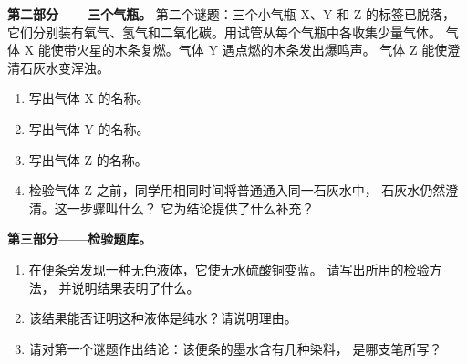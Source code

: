 \begin{problem}
\medskip
\noindent\textbf{第二部分——三个气瓶。}
第二个谜题：三个小气瓶 X、Y 和 Z 的标签已脱落，
它们分别装有氧气、氢气和二氧化碳。用试管从每个气瓶中各收集少量气体。
气体 X 能使带火星的木条复燃。气体 Y 遇点燃的木条发出爆鸣声。
气体 Z 能使澄清石灰水变浑浊。
\begin{enumerate}[resume]
  \item 写出气体 X 的名称。
  \item 写出气体 Y 的名称。
  \item 写出气体 Z 的名称。
  \item 检验气体 Z 之前，同学用相同时间将普通通入同一石灰水中，
        石灰水仍然澄清。这一步骤叫什么？
        它为结论提供了什么补充？
\end{enumerate}

\medskip
\noindent\textbf{第三部分——检验题库。}
\begin{enumerate}[resume]
  \item 在便条旁发现一种无色液体，它使无水硫酸铜变蓝。
        请写出所用的检验方法，
        并说明结果表明了什么。
  \item 该结果能否证明这种液体是纯水？请说明理由。
  \item 请对第一个谜题作出结论：该便条的墨水含有几种染料，
        是哪支笔所写？
\end{enumerate}
\end{problem}
